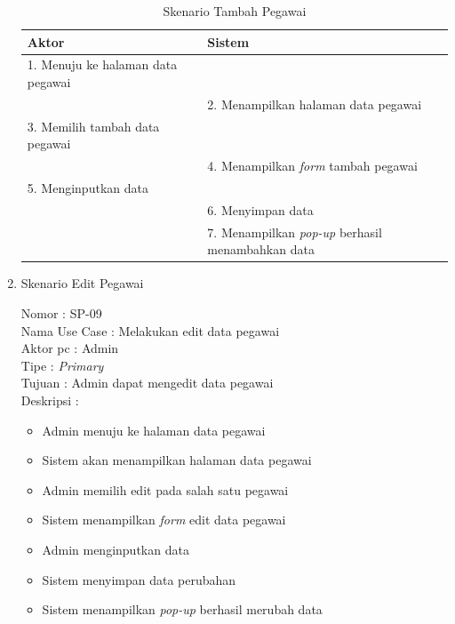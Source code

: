 \begin{enumerate}
\begin{itemize}
\end{itemize}

\begin{table}
	\caption{Skenario Tambah Pegawai}
	\centering
	\begin{tabular}{ | l | p{66.5mm} |}
		\hline 
		\textbf{Aktor} & \textbf{Sistem} \\
		\hline
		
		1.	Menuju ke halaman data pegawai &  \\
		
		\hline
		
		&  2.	Menampilkan halaman data pegawai \\
		
		\hline
		
		3. Memilih tambah data pegawai & \\
		
		\hline
		
		& 4.	Menampilkan \textit{form} tambah pegawai \\
		
		\hline
		
		5. Menginputkan data & \\
		\hline
		
		& 6.	Menyimpan data \\
		
		\hline
		
		& 7.	Menampilkan \textit{pop-up} berhasil menambahkan data \\
		
		\hline
		
		
	\end{tabular}
\end{table}

\item Skenario Edit Pegawai

Nomor \kern 3.6pc : SP-09 \\
Nama Use Case : Melakukan edit data pegawai \\
Aktor  pc : Admin\\
Tipe \kern 4.6pc : \textit{Primary} \\
Tujuan \kern 3.6pc : Admin dapat mengedit data pegawai \\
Deskripsi \kern 2.5pc : 

\begin{itemize}
	\item Admin menuju ke halaman data pegawai
	\item Sistem akan menampilkan halaman data pegawai
	\item Admin memilih edit pada salah satu pegawai
	\item Sistem menampilkan \textit{form} edit data pegawai
	\item Admin menginputkan data
	\item Sistem menyimpan data perubahan
	\item Sistem menampilkan\textit{ pop-up} berhasil merubah data
	

\end{itemize}
\end{enumerate}

